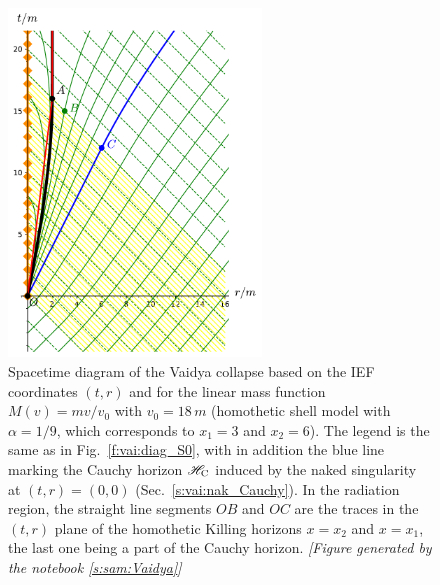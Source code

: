 \begin{figure}
\centerline{\includegraphics[width=0.6\textwidth]{vai_diag_naked_S0.pdf}}
\caption[]{\label{f:vai:diag_naked_S0} \footnotesize
Spacetime diagram of the Vaidya collapse based on the IEF coordinates $(t, r)$
and for the linear mass function $M(v)=m v/v_0$ with $v_0 = 18\, m$
(homothetic shell model with $\alpha = 1/9$,
which corresponds to $x_1 = 3$ and $x_2 = 6$).
The legend is the same as in Fig.~\ref{f:vai:diag_S0}, with in addition
the blue line marking the Cauchy horizon $\mathscr{H}_{\rm C}$ induced by the naked singularity
at $(t,r) = (0,0)$ (Sec.~\ref{s:vai:nak_Cauchy}).
In the radiation region, the straight line segments
$OB$ and $OC$ are the traces in the $(t,r)$ plane of the homothetic Killing horizons $x=x_2$ and $x=x_1$, the last one being a
part of the Cauchy horizon.
\textsl{[Figure generated by the notebook \ref{s:sam:Vaidya}]}
}
\end{figure}

